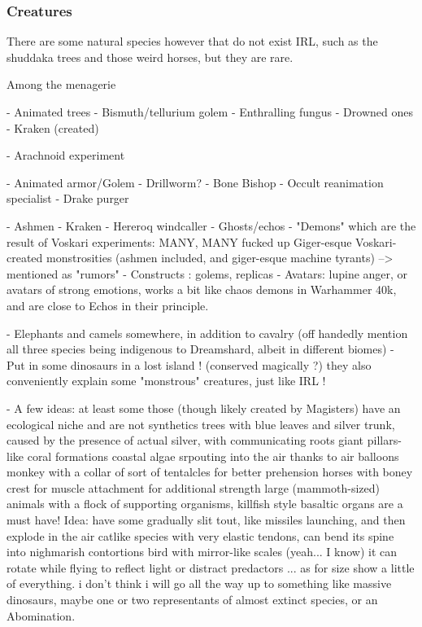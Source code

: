 \subsubsection{Creatures}

There are some natural species however that do not exist IRL, such as the shuddaka trees and those weird horses, but they are rare.


Among the menagerie

- Animated trees
- Bismuth/tellurium golem
- Enthralling fungus
- Drowned ones
- Kraken (created)





- Arachnoid experiment

- Animated armor/Golem
- Drillworm?
- Bone Bishop
- Occult reanimation specialist
- Drake purger

- Ashmen
- Kraken
- Hereroq windcaller
- Ghosts/echos
- "Demons" which are the result of Voskari experiments:	MANY, MANY fucked up Giger-esque Voskari-created monstrosities (ashmen included, and giger-esque machine tyrants) –> mentioned as "rumors"
- Constructs : golems, replicas
- Avatars: lupine anger, or avatars of strong emotions, works a bit like chaos demons in Warhammer 40k, and are close to Echos in their principle.





- Elephants and camels somewhere, in addition to cavalry (off handedly mention all three species being indigenous to Dreamshard, albeit in different biomes)
- Put in some dinosaurs in a lost island ! (conserved magically ?) they also conveniently explain some "monstrous" creatures, just like IRL !

- A few ideas: at least some those (though likely created by Magisters) have an ecological niche and are not synthetics
	trees with blue leaves and silver trunk, caused by the presence of actual silver, with communicating roots
	giant pillars-like coral formations
	coastal algae srpouting into the air thanks to air balloons
	monkey with a collar of sort of tentalcles for better prehension
	horses with boney crest for muscle attachment for additional strength
	large (mammoth-sized) animals with a flock of supporting organisms, killfish style
	basaltic organs are a must have! Idea: have some gradually slit tout, like missiles launching, and then explode in the air
	catlike species with very elastic tendons, can bend its spine into nighmarish contortions
	bird with mirror-like scales (yeah... I know) it can rotate while flying to reflect light or distract predactors
... as for size show a little of everything. i don't think i will go all the way up to something like massive dinosaurs, maybe one or two representants of almost extinct species, or an Abomination.



